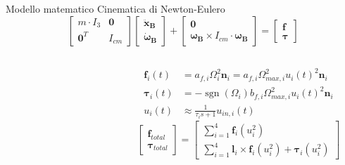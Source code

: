 \documentclass[]{beamer}
\DeclareMathOperator*{\sgn}{sgn}                %
\begin{document}
	\begin{frame}{Modello matematico}
		\centering
		Cinematica di Newton-Eulero
		\begin{equation*}
			\begin{bmatrix}
				m \cdot I_{3} & \mathbf{0} \\
				\mathbf{0}^T          & I_{cm}
			\end{bmatrix}
			\begin{bmatrix}
				\mathbf{\ddot{x}_B}         \\
				\boldsymbol{\dot{\omega}_B}
			\end{bmatrix}
			+
			\begin{bmatrix}
				\mathbf{0}                                                      \\
				\boldsymbol{\omega_B} \times I_{cm} \cdot \boldsymbol{\omega_B}
			\end{bmatrix}
			=
			\begin{bmatrix}
				\mathbf{f}        \\
				\boldsymbol{\tau}
			\end{bmatrix}
		\end{equation*}
		\begin{columns}
			\begin{column}{.55\textwidth}
				\centering
				\begin{figure}
					
				\end{figure}
			\end{column}
			\begin{column}{.55\textwidth}
				\centering
				\small
				\begin{align*}
					\mathbf{f}_i(t) &= a_{f,i}\Omega_i^2\mathbf{n}_i = a_{f,i}\Omega_{max, i}^2 u_i(t)^2\mathbf{n}_i \\
					\boldsymbol{\tau}_i(t) &= -\sgn(\Omega_i)b_{f,i}\Omega_{max,i}^2u_i(t)^2\mathbf{n}_i \\
					u_i(t) &\approx \frac{1}{\tau_i s+1}u_{in,i}(t)
				\end{align*}
				\begin{equation*}
					\begin{bmatrix}
						\mathbf{f}_{total} \\
						\boldsymbol{\tau}_{total}
					\end{bmatrix}
					=
					\begin{bmatrix}
						\sum\limits_{i=1}^{4} \mathbf{f}_i(u_i^2) \\
						\sum\limits_{i=1}^{4} \mathbf{l}_i \times \mathbf{f}_i(u_i^2) + \boldsymbol{\tau}_i(u_i^2)
					\end{bmatrix}
				\end{equation*}
			\end{column}
		\end{columns}
	\end{frame}
	
\end{document}
